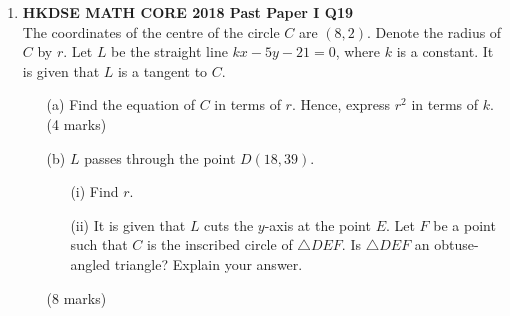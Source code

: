 \documentclass[12pt]{article}
\begin{document}
\begin{enumerate}
	\item \textbf{HKDSE MATH CORE 2018 Past Paper I Q19}\\
	The coordinates of the centre of the circle $C$ are $(8, 2)$. Denote the radius of $C$ by $r$. Let $L$ be the straight line $kx - 5y - 21 = 0$, where $k$ is a constant. It is given that $L$ is a tangent to $C$.
	\begin{enumerate}
		\item[(a)] Find the equation of $C$ in terms of $r$. Hence, express $r^2$ in terms of $k$. \\(4 marks)
		\item[(b)] $L$ passes through the point $D(18, 39)$.
		\begin{enumerate}
			\item[(i)] Find $r$.
			\item[(ii)] It is given that $L$ cuts the $y$-axis at the point $E$. Let $F$ be a point such that $C$ is the inscribed circle of $\triangle DEF$. Is $\triangle DEF$ an obtuse-angled triangle? Explain your answer.
		\end{enumerate}
		(8 marks)
	\end{enumerate}


\end{enumerate}
\end{document}
